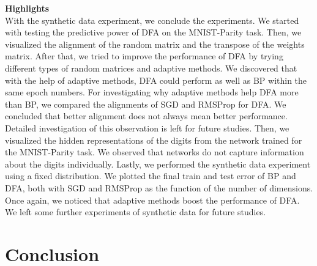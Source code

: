 \documentclass[a4paper, nobind]{templates/ociamthesis}
\begin{document}
\noindent \textbf{Highlights}\\
With the synthetic data experiment, we conclude the experiments. We started with testing the predictive power of DFA on the MNIST-Parity task. Then, we visualized the alignment of the random matrix and the transpose of the weights matrix. After that, we tried to improve the performance of DFA by trying different types of random matrices and adaptive methods. We discovered that with the help of adaptive methods, DFA could perform as well as BP within the same epoch numbers. For investigating why adaptive methods help DFA more than BP, we compared the alignments of SGD and RMSProp for DFA. We concluded that better alignment does not always mean better performance. Detailed investigation of this observation is left for future studies. Then, we visualized the hidden representations of the digits from the network trained for the MNIST-Parity task. We observed that networks do not capture information about the digits individually. Lastly, we performed the synthetic data experiment using a fixed distribution. We plotted the final train and test error of BP and DFA, both with SGD and RMSProp as the function of the number of dimensions. Once again, we noticed that adaptive methods boost the performance of DFA. We left some further experiments of synthetic data for future studies.

\hypertarget{conc}{%
\chapter*{Conclusion}\label{conc}}
\end{document}
